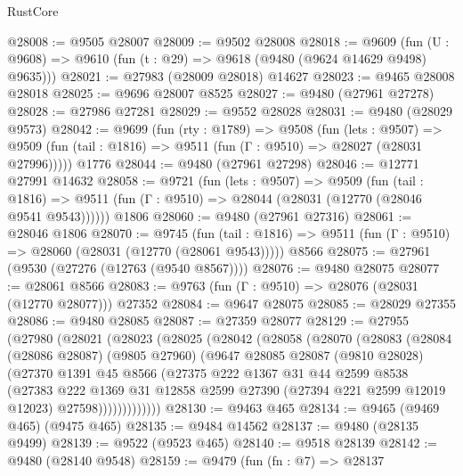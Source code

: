 \begin{lexlean}{RustCore}
\begin{coremodule}
@28008 := @9505 @28007
@28009 := @9502 @28008
@28018 := @9609
    (fun (U : @9608) => @9610 (fun (t : @29) => @9618 (@9480 (@9624 @14629 @9498) @9635)))
@28021 := @27983 (@28009 @28018) @14627
@28023 := @9465 @28008 @28018
@28025 := @9696 @28007 @8525
@28027 := @9480 (@27961 @27278)
@28028 := @27986 @27281
@28029 := @9552 @28028
@28031 := @9480 (@28029 @9573)
@28042 := @9699
    (fun (rty : @1789) =>
    @9508
      (fun (lets : @9507) =>
      @9509 (fun (tail : @1816) => @9511 (fun (Γ : @9510) => @28027 (@28031 @27996)))))
    @1776
@28044 := @9480 (@27961 @27298)
@28046 := @12771 @27991 @14632
@28058 := @9721
    (fun (lets : @9507) =>
    @9509
      (fun (tail : @1816) =>
      @9511 (fun (Γ : @9510) => @28044 (@28031 (@12770 (@28046 @9541 @9543))))))
    @1806
@28060 := @9480 (@27961 @27316)
@28061 := @28046 @1806
@28070 := @9745
    (fun (tail : @1816) => @9511 (fun (Γ : @9510) => @28060 (@28031 (@12770 (@28061 @9543)))))
    @8566
@28075 := @27961 (@9530 (@27276 (@12763 (@9540 @8567))))
@28076 := @9480 @28075
@28077 := @28061 @8566
@28083 := @9763 (fun (Γ : @9510) => @28076 (@28031 (@12770 @28077))) @27352
@28084 := @9647 @28075
@28085 := @28029 @27355
@28086 := @9480 @28085
@28087 := @27359 @28077
@28129 := @27955
    (@27980
      (@28021
        (@28023
          (@28025
            (@28042
              (@28058
                (@28070
                  (@28083
                    (@28084
                      (@28086 @28087)
                      (@9805 @27960)
                      (@9647
                        @28085
                        @28087
                        (@9810 @28028)
                        (@27370
                          @1391
                          @45
                          @8566
                          (@27375
                            @222
                            @1367
                            @31
                            @44
                            @2599
                            @8538
                            (@27383
                              @222
                              @1369
                              @31
                              @12858
                              @2599
                              @27390
                              (@27394 @221 @2599 @12019 @12023)
                              @27598)))))))))))))
@28130 := @9463 @465
@28134 := @9465 (@9469 @465) (@9475 @465)
@28135 := @9484 @14562
@28137 := @9480 (@28135 @9499)
@28139 := @9522 (@9523 @465)
@28140 := @9518 @28139
@28142 := @9480 (@28140 @9548)
@28159 := @9479
    (fun (fn : @7) =>
    @28137

\end{coremodule}
\end{lexlean}
